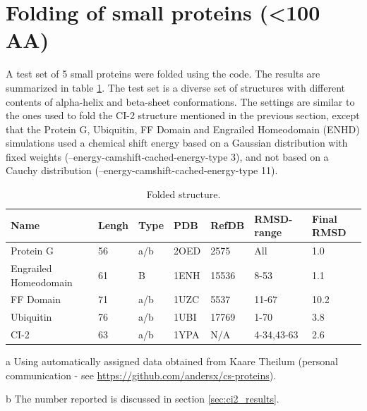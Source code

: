 \section{Folding of small proteins (\textless 100 AA)}

A test set of 5 small proteins were folded using the code. The results are summarized in table \ref{tab:folding_small}. The test set is a diverse set of structures with different contents of alpha-helix and beta-sheet conformations. 
The settings are similar to the ones used to fold the CI-2 structure mentioned in the previous section, except that the Protein G, Ubiquitin, FF Domain and Engrailed Homeodomain (ENHD) simulations used a chemical shift energy based on a Gaussian distribution with fixed weights (--energy-camshift-cached-energy-type 3), and not based on a Cauchy distribution (--energy-camshift-cached-energy-type 11).

\begin{table}[h]
    \caption{Folded structure.}
    \begin{center}
    \begin{threeparttable}
    \begin{tabular}{l l l l l  l l}
Name                & Lengh    & Type & PDB     & RefDB     & RMSD-range    & Final RMSD   \\\hline
Protein G           & 56       & a/b & 2OED    & 2575      & All           & 1.0           \\
Engrailed Homeodomain & 61     & B   & 1ENH    & 15536     & 8-53          & 1.1           \\
FF Domain           & 71       & a/b & 1UZC    & 5537      & 11-67         & 10.2         \\
Ubiquitin           & 76       & a/b & 1UBI    & 17769     & 1-70          & 3.8           \\
CI-2                & 63       & a/b & 1YPA    & N/A\tnote{a}& 4-34,43-63  & 2.6\tnote{b}
    \end{tabular}
    \begin{tablenotes}
    \item[a] Using automatically assigned data obtained from Kaare Theilum (personal communication - see \url{https://github.com/andersx/cs-proteins}).
    \item[b] The number reported is discussed in section \ref{sec:ci2_results}.
    \end{tablenotes}
    \end{threeparttable}
    \end{center}
    \label{tab:folding_small}
\end{table}

